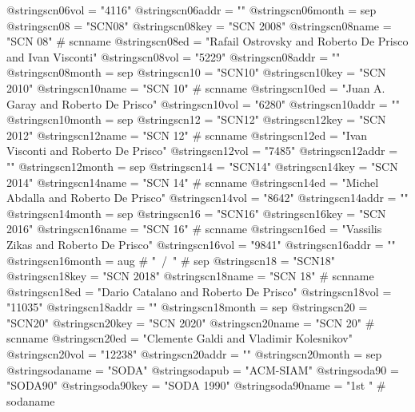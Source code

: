 @string{scn06vol =              "4116"}
@string{scn06addr =             ""}
@string{scn06month =            sep}
@string{scn08 =                 "SCN08"}
@string{scn08key =              "SCN 2008"}
@string{scn08name =             "SCN 08" # scnname}
@string{scn08ed =               "Rafail Ostrovsky and Roberto De Prisco and Ivan Visconti"}
@string{scn08vol =              "5229"}
@string{scn08addr =             ""}
@string{scn08month =            sep}
@string{scn10 =                 "SCN10"}
@string{scn10key =              "SCN 2010"}
@string{scn10name =             "SCN 10" # scnname}
@string{scn10ed =               "Juan A. Garay and Roberto De Prisco"}
@string{scn10vol =              "6280"}
@string{scn10addr =             ""}
@string{scn10month =            sep}
@string{scn12 =                 "SCN12"}
@string{scn12key =              "SCN 2012"}
@string{scn12name =             "SCN 12" # scnname}
@string{scn12ed =               "Ivan Visconti and Roberto De Prisco"}
@string{scn12vol =              "7485"}
@string{scn12addr =             ""}
@string{scn12month =            sep}
@string{scn14 =                 "SCN14"}
@string{scn14key =              "SCN 2014"}
@string{scn14name =             "SCN 14" # scnname}
@string{scn14ed =               "Michel Abdalla and Roberto De Prisco"}
@string{scn14vol =              "8642"}
@string{scn14addr =             ""}
@string{scn14month =            sep}
@string{scn16 =                 "SCN16"}
@string{scn16key =              "SCN 2016"}
@string{scn16name =             "SCN 16" # scnname}
@string{scn16ed =               "Vassilis Zikas and Roberto {De Prisco}"}
@string{scn16vol =              "9841"}
@string{scn16addr =             ""}
@string{scn16month =            aug # "~/~" # sep}
@string{scn18 =                 "SCN18"}
@string{scn18key =              "SCN 2018"}
@string{scn18name =             "SCN 18" # scnname}
@string{scn18ed =               "Dario Catalano and Roberto {De Prisco}"}
@string{scn18vol =              "11035"}
@string{scn18addr =             ""}
@string{scn18month =            sep}
@string{scn20 =                 "SCN20"}
@string{scn20key =              "SCN 2020"}
@string{scn20name =             "SCN 20" # scnname}
@string{scn20ed =               "Clemente Galdi and Vladimir Kolesnikov"}
@string{scn20vol =              "12238"}
@string{scn20addr =             ""}
@string{scn20month =            sep}
@string{sodaname =              "SODA"}
@string{sodapub =               "{ACM-SIAM}"}
@string{soda90 =                "SODA90"}
@string{soda90key =             "SODA 1990"}
@string{soda90name =            "1st " # sodaname}
